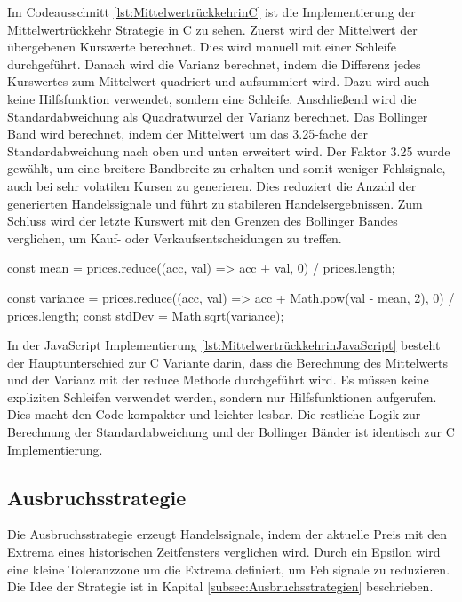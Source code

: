 Im Codeausschnitt \ref{lst:MittelwertrückkehrinC} ist die Implementierung der Mittelwertrückkehr Strategie in C zu sehen.
Zuerst wird der Mittelwert der übergebenen Kurswerte berechnet. Dies wird manuell mit einer Schleife durchgeführt.
Danach wird die Varianz berechnet, indem die Differenz jedes Kurswertes zum Mittelwert quadriert und aufsummiert wird.
Dazu wird auch keine Hilfsfunktion verwendet, sondern eine Schleife.
Anschließend wird die Standardabweichung als Quadratwurzel der Varianz berechnet.
Das Bollinger Band wird berechnet, indem der Mittelwert um das 3.25-fache der Standardabweichung nach oben und unten erweitert wird.
Der Faktor 3.25 wurde gewählt, um eine breitere Bandbreite zu erhalten und somit weniger Fehlsignale, auch bei sehr volatilen Kursen zu generieren.
Dies reduziert die Anzahl der generierten Handelssignale und führt zu stabileren Handelsergebnissen.
Zum Schluss wird der letzte Kurswert mit den Grenzen des Bollinger Bandes verglichen, um Kauf- oder Verkaufsentscheidungen zu treffen.

\begin{JsCode}[caption={Mittelwertrückkehr in JavaScript}, label={lst:MittelwertrückkehrinJavaScript}]
    const mean = prices.reduce((acc, val) => acc + val, 0) / prices.length;

    const variance = prices.reduce((acc, val) => acc + Math.pow(val - mean, 2), 0) / prices.length;
    const stdDev = Math.sqrt(variance);
\end{JsCode}

In der JavaScript Implementierung \ref{lst:MittelwertrückkehrinJavaScript} besteht der Hauptunterschied zur C Variante darin, dass die Berechnung des Mittelwerts und der Varianz mit der reduce Methode durchgeführt wird.
Es müssen keine expliziten Schleifen verwendet werden, sondern nur Hilfsfunktionen aufgerufen.
Dies macht den Code kompakter und leichter lesbar.
Die restliche Logik zur Berechnung der Standardabweichung und der Bollinger Bänder ist identisch zur C Implementierung.

\subsection{Ausbruchsstrategie}
\label{subsec:Ausbruchsstrategie}

Die Ausbruchsstrategie erzeugt Handelssignale, indem der aktuelle Preis mit den Extrema eines historischen Zeitfensters verglichen wird.
Durch ein Epsilon wird eine kleine Toleranzzone um die Extrema definiert, um Fehlsignale zu reduzieren.
Die Idee der Strategie ist in Kapital \ref{subsec:Ausbruchsstrategien} beschrieben.

